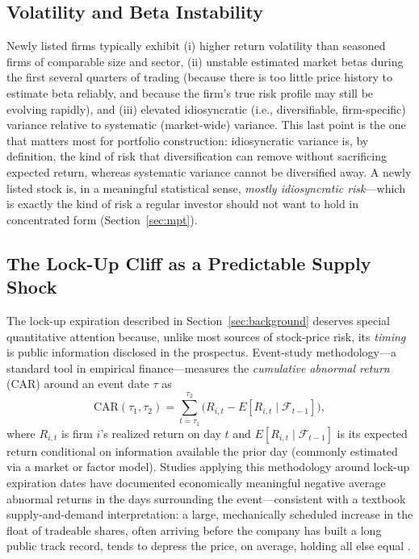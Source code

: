 \documentclass[conference]{IEEEtran}
\begin{document}
\subsection{Volatility and Beta Instability}

Newly listed firms typically exhibit (i) higher return volatility than seasoned firms of comparable size and sector, (ii) unstable estimated market betas during the first several quarters of trading (because there is too little price history to estimate beta reliably, and because the firm's true risk profile may still be evolving rapidly), and (iii) elevated idiosyncratic (i.e., diversifiable, firm-specific) variance relative to systematic (market-wide) variance. This last point is the one that matters most for portfolio construction: idiosyncratic variance is, by definition, the kind of risk that diversification can remove without sacrificing expected return, whereas systematic variance cannot be diversified away. A newly listed stock is, in a meaningful statistical sense, \emph{mostly idiosyncratic risk}---which is exactly the kind of risk a regular investor should not want to hold in concentrated form (Section~\ref{sec:mpt}).

\subsection{The Lock-Up Cliff as a Predictable Supply Shock}

The lock-up expiration described in Section~\ref{sec:background} deserves special quantitative attention because, unlike most sources of stock-price risk, its \emph{timing} is public information disclosed in the prospectus. Event-study methodology---a standard tool in empirical finance---measures the \emph{cumulative abnormal return} (CAR) around an event date $\tau$ as
\begin{equation}
\text{CAR}(\tau_1, \tau_2) = \sum_{t=\tau_1}^{\tau_2} \big( R_{i,t} - E[R_{i,t} \mid \mathcal{F}_{t-1}] \big),
\label{eq:car}
\end{equation}
where $R_{i,t}$ is firm $i$'s realized return on day $t$ and $E[R_{i,t} \mid \mathcal{F}_{t-1}]$ is its expected return conditional on information available the prior day (commonly estimated via a market or factor model). Studies applying this methodology around lock-up expiration dates have documented economically meaningful negative average abnormal returns in the days surrounding the event---consistent with a textbook supply-and-demand interpretation: a large, mechanically scheduled increase in the float of tradeable shares, often arriving before the company has built a long public track record, tends to depress the price, on average, holding all else equal \cite{loughranritter2004}.
\end{document}
